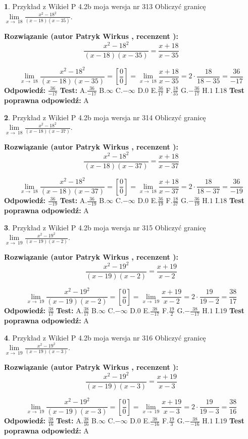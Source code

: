 \documentclass[12pt, a4paper]{article}
\theoremstyle{definition} %
\newtheorem{zad}{}
\newcommand{\zadStart}[1]{\begin{zad}#1\newline}
\newcommand{\zadStop}{\end{zad}}
\newcommand{\rozwStart}[2]{\noindent \textbf{Rozwiązanie (autor #1 , recenzent #2): }\newline}
\newcommand{\rozwStop}{\newline}
\newcommand{\odpStart}{\noindent \textbf{Odpowiedź:}\newline}
\newcommand{\odpStop}{\newline}
\newcommand{\testStart}{\noindent \textbf{Test:}\newline}
\newcommand{\testStop}{\newline}
\newcommand{\kluczStart}{\noindent \textbf{Test poprawna odpowiedź:}\newline}
\newcommand{\kluczStop}{\newline}
\begin{document}
\zadStart{Przykład z Wikieł P 4.2b moja wersja nr 313}
Obliczyć granicę $\lim\limits_{x\to\ 18}\frac{x^{2}-18^{2}}{(x-18)(x-35)}$.
\zadStop
\rozwStart{Patryk Wirkus}{}
$$\frac{x^{2}-18^{2}}{(x-18)(x-35)}=\frac{x+18}{x-35}$$

$$\lim\limits_{x\to\ 18}\frac{x^{2}-18^{2}}{(x-18)(x-35)}=[\frac{0}{0}]=\lim\limits_{x\to\ 18}\frac{x+18}{x-35}=2 \cdot \frac{18}{18-35} = \frac{36}{-17}$$
\rozwStop
\odpStart
$\frac{36}{-17}$
\odpStop
\testStart
A.$\frac{36}{-17}$
B.$\infty$
C.$-\infty$
D.$0$
E.$\frac{36}{17}$
F.$\frac{18}{35}$
G.$-\frac{36}{17}$
H.$1$
I.$18$
\testStop
\kluczStart
A
\kluczStop



\zadStart{Przykład z Wikieł P 4.2b moja wersja nr 314}
Obliczyć granicę $\lim\limits_{x\to\ 18}\frac{x^{2}-18^{2}}{(x-18)(x-37)}$.
\zadStop
\rozwStart{Patryk Wirkus}{}
$$\frac{x^{2}-18^{2}}{(x-18)(x-37)}=\frac{x+18}{x-37}$$

$$\lim\limits_{x\to\ 18}\frac{x^{2}-18^{2}}{(x-18)(x-37)}=[\frac{0}{0}]=\lim\limits_{x\to\ 18}\frac{x+18}{x-37}=2 \cdot \frac{18}{18-37} = \frac{36}{-19}$$
\rozwStop
\odpStart
$\frac{36}{-19}$
\odpStop
\testStart
A.$\frac{36}{-19}$
B.$\infty$
C.$-\infty$
D.$0$
E.$\frac{36}{19}$
F.$\frac{18}{37}$
G.$-\frac{36}{19}$
H.$1$
I.$18$
\testStop
\kluczStart
A
\kluczStop



\zadStart{Przykład z Wikieł P 4.2b moja wersja nr 315}
Obliczyć granicę $\lim\limits_{x\to\ 19}\frac{x^{2}-19^{2}}{(x-19)(x-2)}$.
\zadStop
\rozwStart{Patryk Wirkus}{}
$$\frac{x^{2}-19^{2}}{(x-19)(x-2)}=\frac{x+19}{x-2}$$

$$\lim\limits_{x\to\ 19}\frac{x^{2}-19^{2}}{(x-19)(x-2)}=[\frac{0}{0}]=\lim\limits_{x\to\ 19}\frac{x+19}{x-2}=2 \cdot \frac{19}{19-2} = \frac{38}{17}$$
\rozwStop
\odpStart
$\frac{38}{17}$
\odpStop
\testStart
A.$\frac{38}{17}$
B.$\infty$
C.$-\infty$
D.$0$
E.$\frac{38}{-17}$
F.$\frac{19}{2}$
G.$-\frac{38}{-17}$
H.$1$
I.$19$
\testStop
\kluczStart
A
\kluczStop



\zadStart{Przykład z Wikieł P 4.2b moja wersja nr 316}
Obliczyć granicę $\lim\limits_{x\to\ 19}\frac{x^{2}-19^{2}}{(x-19)(x-3)}$.
\zadStop
\rozwStart{Patryk Wirkus}{}
$$\frac{x^{2}-19^{2}}{(x-19)(x-3)}=\frac{x+19}{x-3}$$

$$\lim\limits_{x\to\ 19}\frac{x^{2}-19^{2}}{(x-19)(x-3)}=[\frac{0}{0}]=\lim\limits_{x\to\ 19}\frac{x+19}{x-3}=2 \cdot \frac{19}{19-3} = \frac{38}{16}$$
\rozwStop
\odpStart
$\frac{38}{16}$
\odpStop
\testStart
A.$\frac{38}{16}$
B.$\infty$
C.$-\infty$
D.$0$
E.$\frac{38}{-16}$
F.$\frac{19}{3}$
G.$-\frac{38}{-16}$
H.$1$
I.$19$
\testStop
\kluczStart
A
\kluczStop
\end{document}
